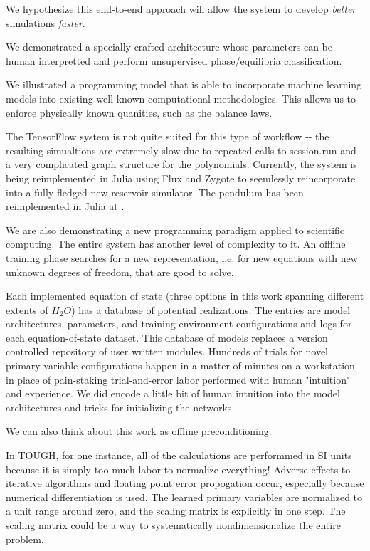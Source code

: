 \documentclass[]{article}
\begin{document}
We hypothesize this end-to-end approach will allow the system to develop
\emph{better} simulations \emph{faster}.

We demonstrated a specially crafted architecture whose parameters can be
human interpretted and perform unsupervised phase/equilibria
classification.

We illustrated a programming model that is able to incorporate machine
learning models into existing well known computational methodologies.
This allows us to enforce physically known quanities, such as the
balance laws.

The TensorFlow system is not quite suited for this type of workflow -\/-
the resulting simualtions are extremely slow due to repeated calls to
session.run and a very complicated graph structure for the polynomials.
Currently, the system is being reimplemented in Julia using Flux and
Zygote to seemlessly reincorporate into a fully-fledged new reservoir
simulator. The pendulum has been reimplemented in Julia at .

We are also demonstrating a new programming paradigm applied to
scientific computing. The entire system has another level of complexity
to it. An offline training phase searches for a new representation, i.e.
for new equations with new unknown degrees of freedom, that are good to
solve.

Each implemented equation of state (three options in this work spanning
different extents of \(H_2O\)) has a database of potential realizations.
The entries are model architectures, parameters, and training
environment configurations and logs for each equation-of-state dataset.
This database of models replaces a version controlled repository of user
written modules. Hundreds of trials for novel primary variable
configurations happen in a matter of minutes on a workstation in place
of pain-staking trial-and-error labor performed with human "intuition"
and experience. We did encode a little bit of human intuition into the
model architectures and tricks for initializing the networks.

We can also think about this work as offline preconditioning.

In TOUGH, for one instance, all of the calculations are performmed in SI units because it is simply too much labor to normalize everything! Adverse effects to iterative algorithms and floating point error propogation occur, especially because numerical differentiation is used.
The learned primary variables are normalized to a unit range around zero, and the scaling matrix is explicitly in one step. The scaling matrix could be a way to systematically nondimensionalize the entire problem.
\end{document}
